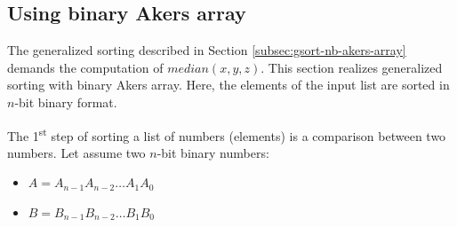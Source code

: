 \documentclass[conference]{IEEEtran}
\begin{document}









\subsection{Using binary Akers array}{\label{subsec:gsort-b-akers-array}}
\medskip
The generalized sorting described in Section \ref{subsec:gsort-nb-akers-array} demands the computation of $median(x, y, z)$. This section realizes generalized sorting with binary Akers array. Here, the elements of the input list are sorted in $n$-bit binary format.
\medskip

The 1\textsuperscript{st} step of sorting a list of numbers (elements) is a comparison between two numbers. Let assume two $n$-bit binary numbers:
\begin{itemize}
     \item $A = A_{n-1}A_{n-2} \ldots A_1A_0$
     \item $B = B_{n-1}B_{n-2} \ldots B_1B_0$
\end{itemize}
\end{document}
